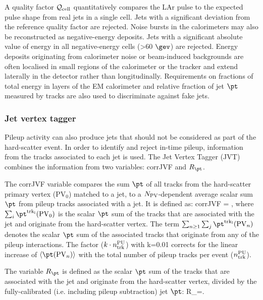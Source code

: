 \bi
\ib A quality factor $\mathcal{Q}_{\rm cell}$ quantitatively compares the LAr pulse to the expected pulse shape from real jets in a single cell. Jets with a significant deviation from the reference quality factor are rejected.
\ib Noise bursts in the calorimeters may also be reconstructed as negative-energy deposits. Jets with a significant absolute value of energy in all negative-energy cells (>60 $\gev$) are rejected.
\ib Energy deposits originating from calorimeter noise or beam-induced backgrounds are often localised in small regions of the calorimeter or the tracker and extend laterally in the detector rather than longitudinally. Requirements on fractions of total energy in layers of the EM calorimeter and relative fraction of jet $\pt$ measured by tracks are also used to discriminate against fake jets.
\ei
\subsubsection{Jet vertex tagger}
Pileup activity can also produce jets that should not be considered as part of the hard-scatter event. In order to identify and reject in-time pileup, information from the tracks associated to each jet is used. The Jet Vertex Tagger (JVT) \cite{ATLAS-CONF-2014-018} combines the information from two variables: corrJVF and $R_{\pt}$.\par
The corrJVF variable compares the sum $\pt$ of all tracks from the hard-scatter primary vertex (PV$_{0}$) matched to a jet, to a $N_{\rm PV}$-dependent average scalar sum $\pt$ from pileup tracks associated with a jet. It is defined as:
\be
{\rm corrJVF} = ,
\ee
\noindent where $\sum_{i} \pt^{\rm trk_{i}} ({\rm PV}_{0})$ is the scalar $\pt$ sum of the tracks that are associated with the jet and originate from the hard-scatter vertex. The term $\sum_{n\ge1} \sum_{j} \pt^{\rm trk_{l}} ({\rm PV}_{n})$ denotes the scalar $ \pt$ sum of the associated tracks that originate from any of the pileup interactions. The factor ($k\cdot n_{\rm trk}^{\rm PU}$) with k=0.01 corrects for the linear increase of $\langle\pt({\rm PV}_{n})\rangle $ with the total number of pileup tracks per event ($n^{\rm PU}_{\rm trk}$).\par
The variable $R_{\pt}$ is defined as the scalar $\pt$ sum of the tracks that are associated with the jet and originate from the hard-scatter vertex, divided by the fully-calibrated (i.e. including pileup subtraction) jet $\pt$:
\be
R_{\pt}=.
\ee


